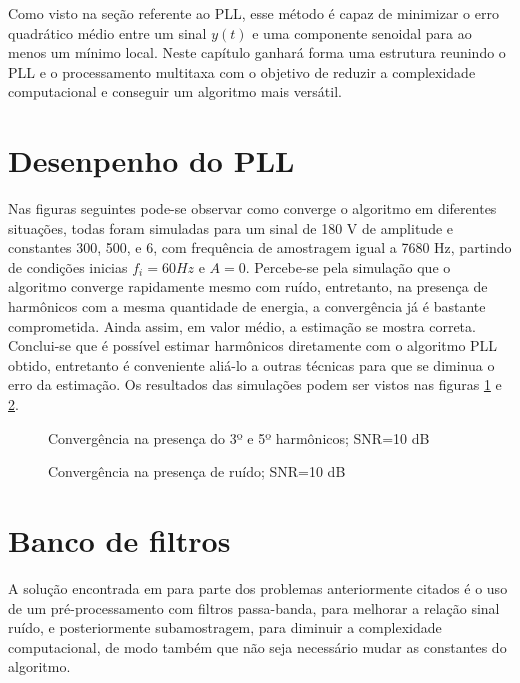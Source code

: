	
Como visto na seção referente ao PLL, esse método é capaz de minimizar o erro quadrático médio entre um sinal $y(t)$ e uma componente senoidal para ao menos um mínimo local. Neste capítulo ganhará forma uma estrutura reunindo o PLL e o processamento multitaxa com o objetivo de reduzir a complexidade computacional e conseguir um algoritmo mais versátil. 

\section{Desenpenho do PLL}
Nas figuras seguintes pode-se observar como converge o algoritmo em diferentes situações, todas foram simuladas para um sinal de 180 V de amplitude e constantes 300, 500, e 6, com frequência de amostragem igual a 7680 Hz, partindo de condições inicias $f_i=60 Hz$ e $A=0$. Percebe-se pela simulação que o algoritmo converge rapidamente mesmo com ruído, entretanto, na presença de harmônicos com a mesma quantidade de energia, a convergência já é bastante comprometida. Ainda assim, em valor médio, a estimação se mostra correta. Conclui-se que é possível estimar harmônicos diretamente com o algoritmo PLL obtido, entretanto é conveniente aliá-lo a outras técnicas para que se diminua o erro da estimação. Os resultados das simulações podem ser vistos nas figuras \ref{fig:PLL_conv1} e \ref{fig:PLL_conv2}.

\begin{figure}[h]
	\centering    
	\def\svgwidth{\columnwidth}
	
	\caption{Convergência na presença do 3º e 5º harmônicos; SNR=10 dB}
	\label{fig:PLL_conv1}
\end{figure}

\begin{figure}[h]
	\centering    
	\def\svgwidth{\columnwidth}
	
	\caption{Convergência na presença de ruído; SNR=10 dB}
	\label{fig:PLL_conv2}
\end{figure}

\section{Banco de filtros}

\indent A solução encontrada em \cite{de2009pll} para parte dos problemas anteriormente citados é o uso de um pré-processamento com filtros passa-banda, para melhorar a relação sinal ruído, e posteriormente subamostragem, para diminuir a complexidade computacional, de modo também que não seja necessário mudar as constantes do algoritmo.

